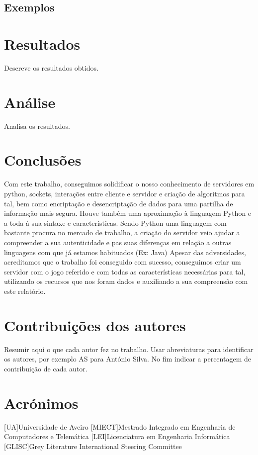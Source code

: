 \documentclass{report}
\begin{document}
\section{Exemplos}


\chapter{Resultados}
\label{chap.resultados}
Descreve os resultados obtidos.

\chapter{Análise}
\label{chap.analise}
Analisa os resultados.

\chapter{Conclusões}
\label{chap.conclusao}
Com este trabalho, conseguimos solidificar o nosso conhecimento de servidores em python, sockets, interações entre 
cliente e servidor e criação de algoritmos para tal, bem como encriptação e desencriptação de dados para uma partilha
de informação mais segura. Houve também uma aproximação à linguagem Python e a toda à sua sintaxe e características.
Sendo Python uma linguagem com bastante procura no mercado de trabalho, a criação do servidor veio ajudar a compreender
a sua autenticidade e pas suas diferenças em relação a outras linguagens com que já estamos habituados (Ex: Java)
Apesar das adversidades, acreditamos que o trabalho foi conseguido com sucesso, conseguimos criar um servidor 
com o jogo referido e com todas as características necessárias para tal, utilizando os recursos que nos foram dados
e auxiliando a sua compreensão com este relatório.

\chapter*{Contribuições dos autores}
Resumir aqui o que cada autor fez no trabalho.
Usar abreviaturas para identificar os autores,
por exemplo AS para António Silva.
No fim indicar a percentagem de contribuição de cada autor.

\chapter*{Acrónimos}
\begin{acronym}
[UA]{Universidade de Aveiro}
[MIECT]{Mestrado Integrado em Engenharia de Computadores e Telemática}
[LEI]{Licenciatura em Engenharia Informática}
[GLISC]{Grey Literature International Steering Committee}
\end{acronym}


\printbibliography
\end{document}
